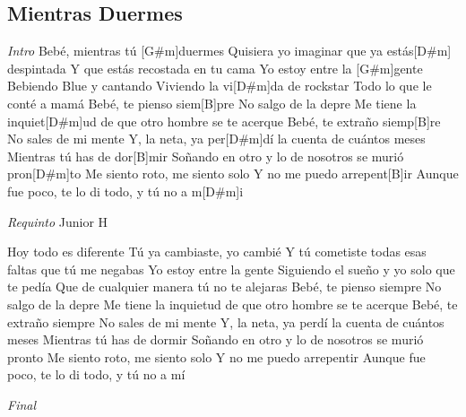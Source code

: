 \subsection{Mientras Duermes}
\noindent
\vspace{1cm}

\begin{guitar}
	\begin{multicols}{2}
		\textit{Intro}
		Bebé, mientras tú [G#m]duermes
		Quisiera yo imaginar que ya estás[D#m] despintada
	Y que estás recostada en tu cama
	Yo estoy entre la [G#m]gente
	Bebiendo Blue y cantando
	Viviendo la vi[D#m]da de rockstar
	Todo lo que le conté a mamá
	Bebé, te pienso siem[B]pre
	No salgo de la depre
	Me tiene la inquiet[D#m]ud de que otro hombre se te acerque
	Bebé, te extraño siemp[B]re
	No sales de mi mente
	Y, la neta, ya per[D#m]dí la cuenta de cuántos meses
	Mientras tú has de dor[B]mir
	Soñando en otro y lo de nosotros se murió pron[D#m]to
	Me siento roto, me siento solo
	Y no me puedo arrepent[B]ir
	Aunque fue poco, te lo di todo, y tú no a m[D#m]i
	\par
	\textit{Requinto}
	Junior H

	\par
	Hoy todo es diferente
	Tú ya cambiaste, yo cambié
	Y tú cometiste todas esas faltas que tú me negabas
	Yo estoy entre la gente
	Siguiendo el sueño y yo solo que te pedía
	Que de cualquier manera tú no te alejaras
	Bebé, te pienso siempre
	No salgo de la depre
	Me tiene la inquietud de que otro hombre se te acerque
	Bebé, te extraño siempre
	No sales de mi mente
	Y, la neta, ya perdí la cuenta de cuántos meses
	Mientras tú has de dormir
	Soñando en otro y lo de nosotros se murió pronto
	Me siento roto, me siento solo
	Y no me puedo arrepentir
	Aunque fue poco, te lo di todo, y tú no a mí
		\par
		\textit{Final}
	\end{multicols}
\end{guitar}
